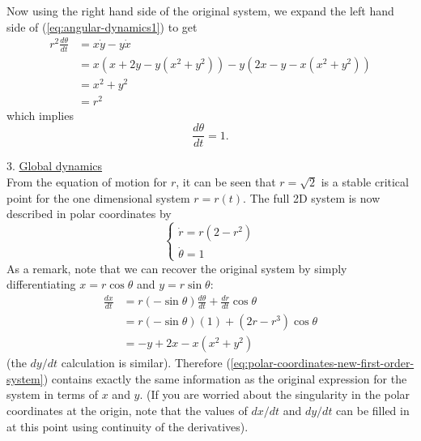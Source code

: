 \documentclass[11pt, letterpaper, oneside]{article}     %
\numberwithin{equation}{subsection}
\theoremstyle{definition}
\numberwithin{theorem}{section}
\theoremstyle{remark}
\begin{document}
\begin{enumerate}
  Now using the right hand side of the original system, we expand the left hand side of (\ref{eq:angular-dynamics1}) to get
  \begin{equation}
    \begin{split}
      r^2\frac{d\theta}{dt} &= x\dot y - y\dot x\\
      &= x(x+2y - y(x^2+y^2)) - y(2x-y-x(x^2+y^2))\\
      &= x^2 + y^2\\
      &= r^2
    \end{split}
  \end{equation}
  which implies
  \begin{equation}
    \frac{d\theta}{dt} = 1.
  \end{equation}

  3. \underline{Global dynamics}\\
  From the equation of motion for $r$, it can be seen that $r = \sqrt2$ is a stable critical point for the one dimensional system $r = r(t)$. The full 2D system is now described in polar coordinates by
  \begin{equation}\label{eq:polar-coordinates-new-first-order-system}
    \begin{cases}
      \dot r = r(2-r^2)\\
      \dot \theta = 1
    \end{cases}
  \end{equation}
  As a remark, note that we can recover the original system by simply differentiating $x = r\cos\theta$ and $y = r\sin\theta$:
  \begin{equation}
    \begin{split}
      \frac{dx}{dt} &= r(-\sin\theta)\frac{d\theta}{dt} + \frac{dr}{dt}\cos\theta\\
      &= r(-\sin\theta)(1) + (2r - r^3)\cos\theta\\
      &= -y + 2x - x(x^2 + y^2)
    \end{split}
  \end{equation}
  (the $dy/dt$ calculation is similar). Therefore (\ref{eq:polar-coordinates-new-first-order-system}) contains exactly the same information as the original expression for the system in terms of $x$ and $y$. (If you are worried about the singularity in the polar coordinates at the origin, note that the values of $dx/dt$ and $dy/dt$ can be filled in at this point using continuity of the derivatives).


\end{enumerate}
\end{document}
